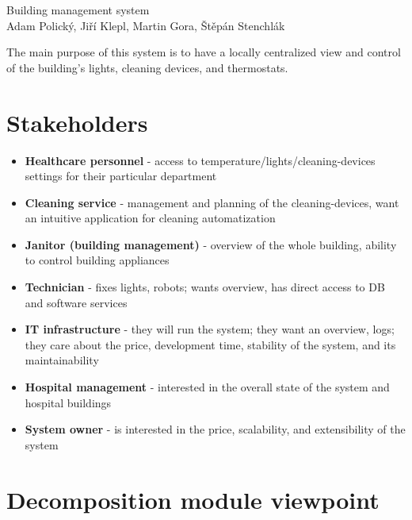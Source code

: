 \documentclass{article}
\begin{document}
\begin{center}
    \Large Building management system\\
    {\large Adam Polický, Jiří Klepl, Martin Gora, Štěpán Stenchlák}
\end{center}

\smallskip{}

The main purpose of this system is to have a locally centralized view and control of the building’s lights, cleaning devices, and thermostats.

\section*{Stakeholders}

\begin{itemize}
\itemsep0em 
\item \textbf{Healthcare personnel} - access to temperature/lights/cleaning-devices settings for their particular department
\item \textbf{Cleaning service} - management and planning of the cleaning-devices, want an intuitive application for cleaning automatization 
\item \textbf{Janitor (building management)} - overview of the whole building, ability to control building appliances
\item \textbf{Technician} - fixes lights, robots; wants overview, has direct access to DB and software services
\item \textbf{IT infrastructure} - they will run the system; they want an overview, logs; they care about the price, development time, stability of the system, and its maintainability    
\item \textbf{Hospital management} - interested in the overall state of the system and hospital buildings
\item \textbf{System owner} - is interested in the price, scalability, and extensibility of the system
\end{itemize}

\section*{Decomposition module viewpoint}
\end{document}
